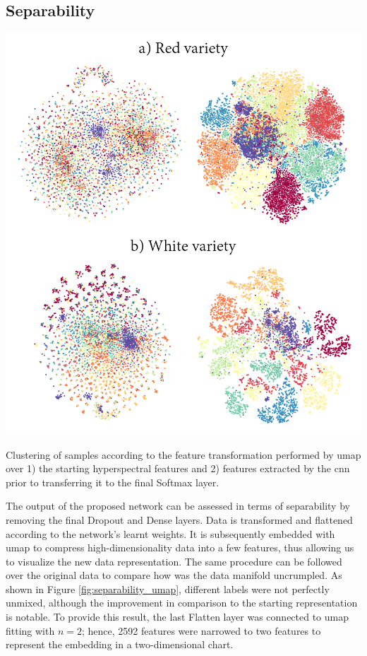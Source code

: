 \FloatBarrier
\newpage
\subsection{Separability}

\begin{marginfigure}[.5cm]
    \centering
    \includegraphics[width=\linewidth]{figs/vineyard_classification/separability.png}
	\caption{Clustering of samples according to the feature transformation performed by \acrshort{umap} over 1) the starting hyperspectral features and 2) features extracted by the \acrshort{cnn} prior to transferring it to the final Softmax layer. }
	\label{fig:separability_umap}
\end{marginfigure}
The output of the proposed network can be assessed in terms of separability by removing the final Dropout and Dense layers. Data is transformed and flattened according to the network's learnt weights. It is subsequently embedded with \acrshort{umap} \cite{mcinnes_umap_2020} to compress high-dimensionality data into a few features, thus allowing us to visualize the new data representation. The same procedure can be followed over the original data to compare how was the data manifold uncrumpled. As shown in Figure \ref{fig:separability_umap}, different labels were not perfectly unmixed, although the improvement in comparison to the starting representation is notable. To provide this result, the last Flatten layer was connected to \acrshort{umap} fitting with $n = 2$; hence, 2592 features were narrowed to two features to represent the embedding in a two-dimensional chart.

